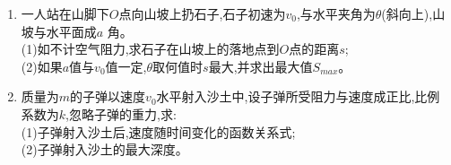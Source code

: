 
\begin{enumerate}
\item 一人站在山脚下$O$点向山坡上扔石子,石子初速为$v_0$,与水平夹角为$\theta$(斜向上),山坡与水平面成$a$ 角。\\
(1)如不计空气阻力,求石子在山坡上的落地点到$O$点的距离$s$;\\
(2)如果$a$值与$v_0$值一定,$\theta$取何值时$s$最大,并求出最大值$S_{max}$。
\item 质量为$m$的子弹以速度$v_0$水平射入沙土中,设子弹所受阻力与速度成正比,比例系数为$k$,忽略子弹的重力,求:\\
(1)子弹射入沙土后,速度随时间变化的函数关系式;\\
(2)子弹射入沙土的最大深度。
\end{enumerate}